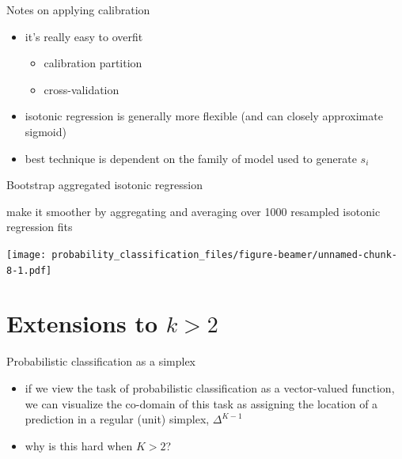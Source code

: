 \documentclass[ignorenonframetext,]{beamer}
\providecommand{\tightlist}{%
\setlength{\itemsep}{0pt}\setlength{\parskip}{0pt}}
\begin{document}
\begin{frame}{Notes on applying calibration}

\begin{itemize}
\tightlist
\item
  it's really easy to overfit

  \begin{itemize}
  \tightlist
  \item
    calibration partition
  \item
    cross-validation
  \end{itemize}
\end{itemize}

\vspace{1mm}

\begin{itemize}
\tightlist
\item
  isotonic regression is generally more flexible (and can closely
  approximate sigmoid)
\end{itemize}

\vspace{1mm}

\begin{itemize}
\tightlist
\item
  best technique is dependent on the family of model used to generate
  \(s_i\)
\end{itemize}

\end{frame}

\begin{frame}{Bootstrap aggregated isotonic regression}

make it smoother by aggregating and averaging over 1000 resampled
isotonic regression fits

\texttt{[image: probability\_classification\_files/figure-beamer/unnamed-chunk-8-1.pdf]}

\end{frame}

\section{\texorpdfstring{Extensions to
\(k > 2\)}{Extensions to k \textgreater{} 2}}\label{extensions-to-k-2}

\begin{frame}{Probabilistic classification as a simplex}

\begin{itemize}
\tightlist
\item
  if we view the task of probabilistic classification as a vector-valued
  function, we can visualize the co-domain of this task as assigning the
  location of a prediction in a regular (unit) simplex, \(\Delta^{K-1}\)
  \vspace{2mm}
\item
  why is this hard when \(K > 2\)?
\end{itemize}

\end{frame}
\end{document}
